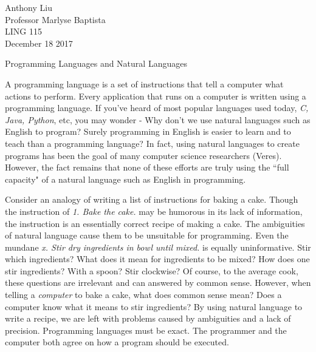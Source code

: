 \documentclass[12pt]{article}
\begin{document}
\begin{flushleft}

Anthony Liu\\
Professor Marlyse Baptista\\
LING 115\\
December 18 2017\\


\begin{center}
Programming Languages and Natural Languages
\end{center}


\setlength{\parindent}{0.5in}

A programming language is a set of instructions that tell a computer
what actions to perform. Every application that runs on a computer
is written using a programming language.
%
If you've heard of
most popular languages used today, \textit{C, Java, Python}, etc, you may
wonder - Why don't we use natural languages such as English to
program? Surely programming in English is easier to learn and to teach
than a programming language?
%
In fact, using natural languages to create programs has been the goal
of many computer science researchers (Veres). However, the fact remains
that none of these efforts are truly using the ``full capacity" of
a natural language such as English in programming.

Consider an analogy of writing a list of instructions for baking
a cake. Though the instruction of \textit{1. Bake the cake.} may be humorous
in its lack of information, the instruction is an essentially correct
recipe of making a cake. The ambiguities of natural language
cause them to be unsuitable for programming.
%
Even the mundane \textit{x. Stir dry ingredients in bowl until mixed.}
is equally uninformative. Stir which ingredients?
What does it mean for ingredients to be mixed? How does one stir ingredients?
With a spoon? Stir clockwise? Of course, to the average cook, these questions are
irrelevant and can answered by common sense. However, when telling a
\textit{computer} to bake a cake, what does common sense mean? Does a
computer know what it means to stir ingredients?
%
By using natural language to write a recipe, we are left with
problems caused by ambiguities and a lack of precision.
Programming languages must be exact. The programmer and the computer
both agree on how a program should be executed.


\end{flushleft}
\end{document}
